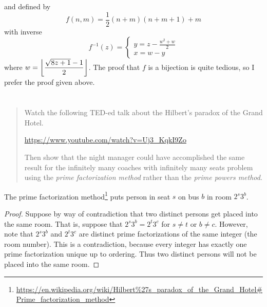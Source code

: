 \documentclass{article}
\begin{document}
and defined by
\[f(n, m) = \frac{1}{2}(n + m)(n + m + 1) + m\]
with inverse
\[f^{-1}(z) = \begin{cases}y = z - \frac{w^2 + w}{2}\\ x = w - y\end{cases}\]
where $\displaystyle w = \floor*{\frac{\sqrt{8z + 1} - 1}{2}}$. The proof that $f$ is a bijection
is quite tedious, so I prefer the proof given above.

\section{}
\begin{quote}
    Watch the following TED-ed talk about the Hilbert's paradox of the Grand
    Hotel.
    \begin{center}
        \url{https://www.youtube.com/watch?v=Uj3_KqkI9Zo}
    \end{center}
    Then show that the night manager could have accomplished the same result
    for the infinitely many coaches with infinitely many seats problem using
    the \textit{prime factorization method} rather than the \textit{prime
        powers method}.
\end{quote}

The prime factorization
method\footnote{\url{https://en.wikipedia.org/wiki/Hilbert\%27s_paradox_of_the_Grand_Hotel\#Prime_factorization_method}} puts person in seat $s$ on bus $b$ in room $2^s3^b$.

\begin{proof}
    Suppose by way of contradiction that two distinct persons get placed into the same room. That
    is, suppose that $2^s3^b = 2^t3^c$ for $s \neq t$ or $b \neq c$. However, note that $2^s3^b$
    and $2^t3^c$ are distinct prime factorizations of the same integer (the room number). This is a
    contradiction, because every integer has exactly one prime factorization unique up to ordering.
    Thus two distinct persons will not be placed into the same room.
\end{proof}
\end{document}
